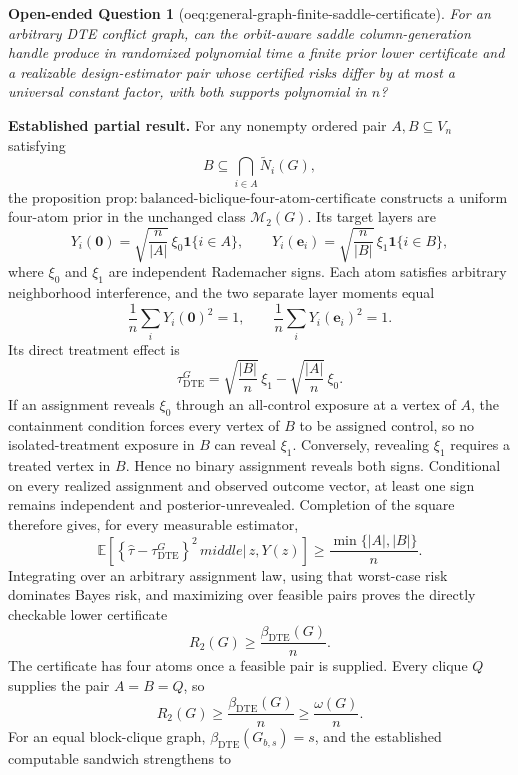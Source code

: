 \documentclass{article}
\newtheorem{openendedquestion}{Open-ended Question}
\begin{document}
\begin{openendedquestion}[oeq:general-graph-finite-saddle-certificate]\label{oeq:general-graph-finite-saddle-certificate}
For an arbitrary DTE conflict graph, can the orbit-aware saddle column-generation handle produce in randomized polynomial time a finite prior lower certificate and a realizable design-estimator pair whose certified risks differ by at most a universal constant factor, with both supports polynomial in \(n\)?
\end{openendedquestion}
\textbf{Established partial result.}
For any nonempty ordered pair \(A,B\subseteq V_n\) satisfying
\[
B\subseteq\bigcap_{i\in A}\widetilde N_i(G),
\]
the proposition \(\mathrm{prop{:}balanced\text{-}biclique\text{-}four\text{-}atom\text{-}certificate}\) constructs a uniform four-atom prior in the unchanged class \(\mathcal M_2(G)\).  Its target layers are
\[
Y_i(\mathbf 0)=\sqrt{\frac{n}{|A|}}\,\xi_0\mathbf 1\{i\in A\},
\qquad
Y_i(\mathbf e_i)=\sqrt{\frac{n}{|B|}}\,\xi_1\mathbf 1\{i\in B\},
\]
where \(\xi_0\) and \(\xi_1\) are independent Rademacher signs.  Each atom satisfies arbitrary neighborhood interference, and the two separate layer moments equal
\[
\frac1n\sum_iY_i(\mathbf0)^2=1,
\qquad
\frac1n\sum_iY_i(\mathbf e_i)^2=1.
\]
Its direct treatment effect is
\[
\tau_{\mathrm{DTE}}^G
=
\sqrt{\frac{|B|}{n}}\,\xi_1
-
\sqrt{\frac{|A|}{n}}\,\xi_0.
\]
If an assignment reveals \(\xi_0\) through an all-control exposure at a vertex of \(A\), the containment condition forces every vertex of \(B\) to be assigned control, so no isolated-treatment exposure in \(B\) can reveal \(\xi_1\).  Conversely, revealing \(\xi_1\) requires a treated vertex in \(B\).  Hence no binary assignment reveals both signs.  Conditional on every realized assignment and observed outcome vector, at least one sign remains independent and posterior-unrevealed.  Completion of the square therefore gives, for every measurable estimator,
\[
\mathbb E\!\left[
\left\{\widehat\tau-\tau_{\mathrm{DTE}}^G\right\}^2
\,middle|\,z,Y(z)
\right]
\geq
\frac{\min\{|A|,|B|\}}{n}.
\]
Integrating over an arbitrary assignment law, using that worst-case risk dominates Bayes risk, and maximizing over feasible pairs proves the directly checkable lower certificate
\[
R_2(G)\geq\frac{\beta_{\mathrm{DTE}}(G)}{n}.
\]
The certificate has four atoms once a feasible pair is supplied.  Every clique \(Q\) supplies the pair \(A=B=Q\), so
\[
R_2(G)\geq\frac{\beta_{\mathrm{DTE}}(G)}n
\geq\frac{\omega(G)}n.
\]
For an equal block-clique graph, \(\beta_{\mathrm{DTE}}(G_{b,s})=s\), and the established computable sandwich strengthens to
\end{document}
